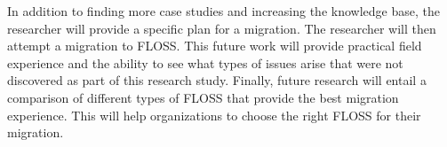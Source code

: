 In addition to finding more case studies and increasing the knowledge base, the researcher will provide a specific plan for a migration. The researcher will then attempt a migration to FLOSS. This future work will provide practical field experience and the ability to see what types of issues arise that were not discovered as part of this research study.  Finally, future research will entail a comparison of different types of FLOSS that provide the best migration experience. This will help organizations to choose the right FLOSS for their migration.                                                                                                                                                                                                                                                                                                                                                                                                                                                                                                                                                                                                                       



